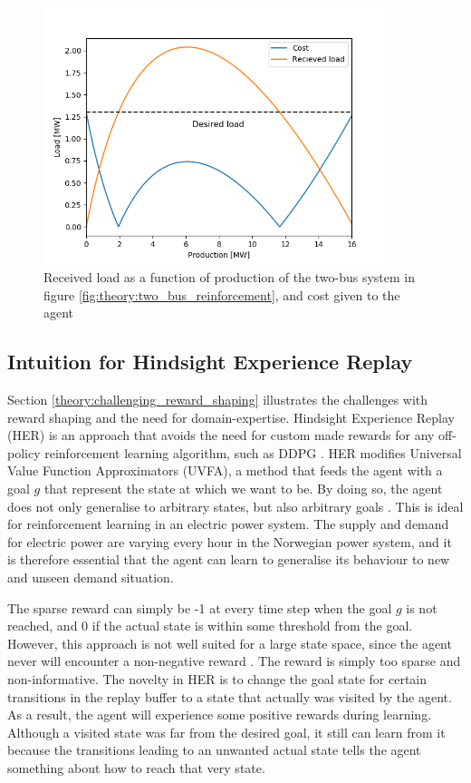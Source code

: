 \documentclass[class=book, crop=false]{standalone}
\begin{document}
\begin{figure}[ht!]
    \center
    \includegraphics[height=7.5cm, width=10cm]{figures/twobus_load_balance.png}
    \caption[size = 9]{Received load as a function of production of the two-bus system in figure \ref{fig:theory:two_bus_reinforcement}, and cost given to the agent}
    \label{fig:theory:two_bus_failing}
\end{figure}


\subsection{Intuition for Hindsight Experience Replay}
Section \ref{theory:challenging_reward_shaping}  illustrates the challenges with reward shaping and the need for domain-expertise. Hindsight Experience Replay (HER) is an approach that avoids the need for custom made rewards for any off-policy reinforcement learning algorithm, such as DDPG \cite{DBLP:journals/corr/Andrychowicz_HER}. HER modifies Universal Value Function Approximators (UVFA), a method that feeds the agent with a goal $g$ that represent the state at which we want to be. By doing so, the agent does not only generalise to arbitrary states, but also arbitrary goals \cite{schaul15_goal_states}. This is ideal for reinforcement learning in an electric power system. The
supply and demand for electric power are varying every hour in the Norwegian power system, and it is therefore essential that the agent can learn to generalise its behaviour to new and unseen demand situation. 

The sparse reward can simply be -1 at every time step when the goal $g$ is not reached, and 0 if the actual state is within some threshold from the goal. However, this approach is not well suited for a large state space, since the agent never will encounter a non-negative reward \cite{DBLP:journals/corr/Andrychowicz_HER}. The reward is simply too sparse and non-informative. The novelty in HER is to change the goal state for certain transitions in the replay buffer to a state that actually was visited by the agent. As a result, the agent will experience some positive rewards during learning. Although a visited state was far from the desired goal, it still can learn from it because the transitions leading to an unwanted actual state tells the agent something about how to reach that very state. 
\end{document}
